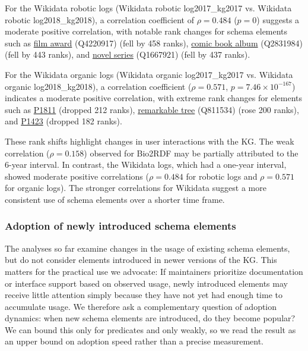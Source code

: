\documentclass[sw]{iosart2x}
\begin{document}
For the Wikidata robotic logs (Wikidata robotic log2017\_kg2017 vs. Wikidata robotic log2018\_kg2018), a correlation coefficient of $\rho = 0.484$ ($p = 0$) suggests a
moderate positive correlation, with notable rank changes for schema elements such as 
\href{http://www.wikidata.org/entity/Q4220917}{film award} (Q4220917) (fell by 458 ranks), 
\href{http://www.wikidata.org/entity/Q2831984}{comic book album} (Q2831984) (fell by 443 ranks), and 
\href{http://www.wikidata.org/entity/Q1667921}{novel series} (Q1667921) (fell by 437 ranks).

For the Wikidata organic logs (Wikidata organic log2017\_kg2017 vs. Wikidata organic log2018\_kg2018), a correlation coefficient ($\rho = 0.571$, $p = 7.46 \times 10^{-167}$) indicates a moderate positive correlation, with extreme rank changes for elements such as 
\href{http://www.wikidata.org/prop/direct/P1811}{P1811} (dropped 212 ranks), 
\href{http://www.wikidata.org/entity/Q811534}{remarkable tree} (Q811534) (rose 200 ranks), and 
\href{http://www.wikidata.org/prop/direct/P1423}{P1423} (dropped 182 ranks).

These rank shifts highlight changes in user interactions with the KG. The weak correlation ($\rho = 0.158$) observed for Bio2RDF may be partially attributed to the 6-year interval. In contrast, the Wikidata logs, which had a one-year interval, showed moderate positive correlations ($\rho = 0.484$ for robotic logs and $\rho = 0.571$ for organic logs). The stronger correlations for Wikidata suggest a more consistent use of schema elements over a shorter time frame.

\subsubsection{Adoption of newly introduced schema elements}\label{sec:adoption}
The analyses so far examine changes in the usage of existing schema elements, but do not consider elements introduced in newer versions of the KG. This matters for the practical use we advocate: If maintainers prioritize documentation or interface support based on observed usage, newly introduced elements may receive little attention simply because they have not yet had enough time to accumulate usage.  We therefore ask a complementary question of adoption dynamics: when new schema elements are introduced, do they become popular?
We can bound this only for predicates and only weakly, so we read the result as an upper bound on adoption speed rather than a precise measurement. 
\end{document}
